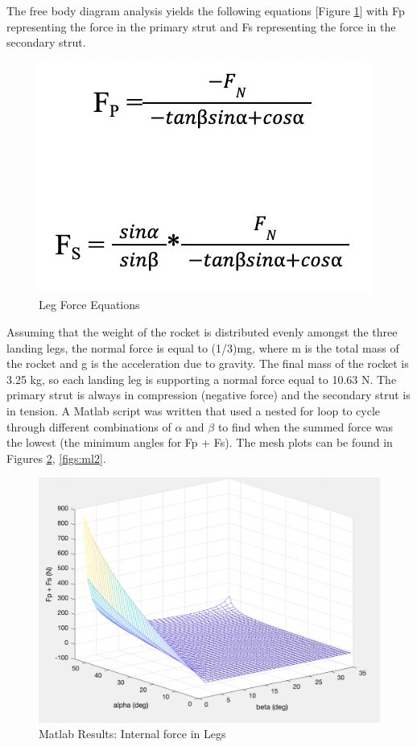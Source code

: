 The free body diagram analysis yields the following equations [Figure \ref{figs:forceeqn}] with Fp representing the force in the primary strut and Fs representing the force in the secondary strut. 

\begin{figure}[H]
\centering
\includegraphics[scale=0.6]{src/figs/legforceequations.png}
\caption{Leg Force Equations}
\label{figs:forceeqn}
\end{figure}

Assuming that the weight of the rocket is distributed evenly amongst the three landing legs, the normal force is equal to (1/3)mg, where m is the total mass of the rocket and g is the acceleration due to gravity. The final mass of the rocket is 3.25 kg, so each landing leg is supporting a normal force equal to 10.63 N. The primary strut is always in compression (negative force) and the secondary strut is in tension. A Matlab script was written that used a nested for loop to cycle through different combinations of $\alpha$ and $\beta$ to find when the summed force was the lowest (the minimum angles for Fp + Fs). The mesh plots can be found in Figures \ref{figs:ml1}, \ref{figs:ml2}.

\begin{figure}[H]
\centering
\includegraphics[scale=0.6]{src/figs/ml1.png}
\caption{Matlab Results: Internal force in Legs}
\label{figs:ml1}
\end{figure}

